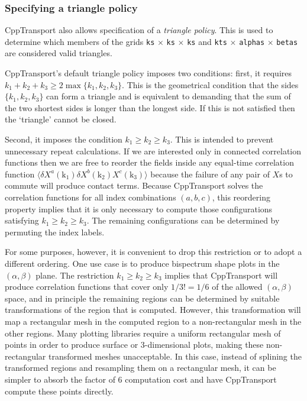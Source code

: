 \documentclass[11pt,a4paper]{article}
\newcommand{\vect}[1]{\bm{\mathrm{{#1}}}}
\newcommand{\packagefont}{\sffamily}
\newcommand{\CppTransport}{{\packagefont CppTransport}}
\renewcommand{\geq}{\geqslant}
\begin{document}
\subsubsection{Specifying a triangle policy}
\label{sec:triangle-policy}
{\CppTransport} also allows specification of a \emph{triangle policy}.
This is used to determine which members of the grids
\texttt{ks} $\times$ \texttt{ks} $\times$ \texttt{ks}
and
\texttt{kts} $\times$ \texttt{alphas} $\times$ \texttt{betas}
are considered valid triangles.

{\CppTransport}'s default triangle policy imposes two conditions: first,
it requires $k_1 + k_2 + k_3 \geq 2 \max \{ k_1, k_2, k_3 \}$.
This is the geometrical condition that the sides
$\{ k_1, k_2, k_3 \}$ can form a triangle
and is equivalent to demanding that the sum of the two shortest sides is longer than the
longest side.
If this is not satisfied then the `triangle' cannot be closed.

Second, it imposes the condition
$k_1 \geq k_2 \geq k_3$.
This is intended to prevent unnecessary repeat calculations.
If we are interested only in connected correlation functions
then we are free to reorder the fields inside any
equal-time
correlation function
$\langle \delta X^a(\vect{k}_1) \delta X^b(\vect{k}_2) X^c(\vect{k}_3) \rangle$
because the failure of any pair of $X$s to commute will produce
contact terms.
Because {\CppTransport} solves the correlation functions for
all index combinations $(a,b,c)$, this reordering property
implies that it is only necessary to compute those configurations
satisfying $k_1 \geq k_2 \geq k_3$.
The remaining configurations can be determined by
permuting the index labels.

For some purposes, however, it is convenient to drop this restriction
or to adopt a different ordering. One use case is to produce
bispectrum shape plots in the $(\alpha, \beta)$ plane.
The restriction $k_1 \geq k_2 \geq k_3$ implies that
{\CppTransport} will produce correlation functions that cover only
$1/3! = 1/6$ of the allowed $(\alpha, \beta)$ space,
and in principle the remaining
regions can be determined by suitable transformations
of the region that is computed.
However, this transformation will map a rectangular mesh
in the computed region
to a non-rectangular mesh in the other regions.
Many plotting libraries require a uniform rectangular mesh
of points in order to produce surface or 3-dimensional plots,
making these non-rectangular transformed meshes unacceptable.
In this case, instead of splining the transformed regions and resampling
them on a rectangular mesh, it can be simpler
to absorb the factor of 6 computation cost and have
{\CppTransport} compute these points directly.
\end{document}
